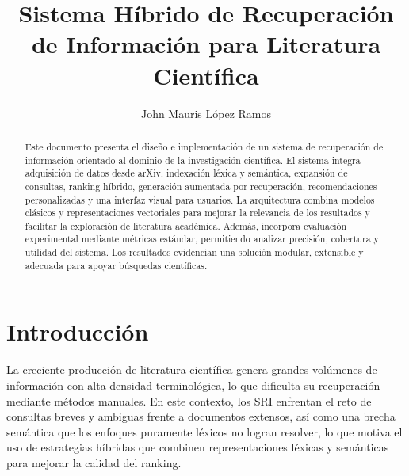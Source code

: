 \documentclass[runningheads]{llncs}
\begin{document}
\title{Sistema Híbrido de Recuperación de Información para Literatura Científica}

\author{John Mauris López Ramos}
 

\maketitle

\begin{abstract}

Este documento presenta el diseño e implementación de un sistema de recuperación de información orientado al dominio 
de la investigación científica. 
El sistema integra adquisición de datos desde arXiv, indexación léxica y semántica, 
expansión de consultas, ranking híbrido, generación aumentada por recuperación, 
recomendaciones personalizadas y una interfaz visual para usuarios. 
La arquitectura combina modelos clásicos y representaciones vectoriales para mejorar la relevancia de los resultados y 
facilitar la exploración de literatura académica. 
Además, incorpora evaluación experimental mediante métricas estándar, permitiendo analizar precisión, 
cobertura y utilidad del sistema. 
Los resultados evidencian una solución modular, extensible y adecuada para apoyar búsquedas científicas.

\end{abstract}

\section{Introducción}

La creciente producción de literatura científica genera grandes volúmenes de información con alta densidad terminológica, 
lo que dificulta su recuperación mediante métodos manuales. 
En este contexto, los SRI enfrentan el reto de consultas breves y ambiguas frente a documentos extensos, 
así como una brecha semántica que los enfoques puramente léxicos no logran resolver, 
lo que motiva el uso de estrategias híbridas que combinen representaciones léxicas y semánticas para mejorar la calidad del ranking.
\end{document}

